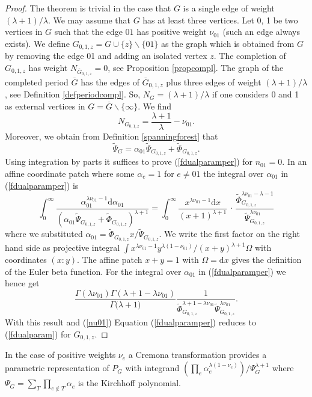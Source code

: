 \documentclass[oneside]{amsart}
\newcommand{\dd}{\mathrm{d}}
\newcommand{\Gg}{{\overline{G}}}
\theoremstyle{plain}
\begin{document}
\begin{proof}
The theorem is trivial in the case that $G$ is a single edge of weight $(\lambda+1)/\lambda$. We may assume that $G$ has at least three vertices. Let 0, 1 be two vertices in $G$
such that the edge $01$ has positive weight $\nu_{01}$ (such an edge always exists). We define $G_{0,1,z}=G\cup\{z\}\backslash\{01\}$ as the graph which is obtained
from $G$ by removing the edge 01 and adding an isolated vertex $z$. The completion of $G_{0,1,z}$ has weight $N_{\Gg_{0,1,z}}=0$, see Proposition \ref{propcompl}.
The graph of the completed period $\Gg$ has the edges of $\Gg_{0,1,z}$ plus three edges of weight $(\lambda+1)/\lambda$, see Definition \ref{defperiodcompl}.
So, $N_G=(\lambda+1)/\lambda$ if one considers 0 and 1 as external vertices in $G=\Gg\backslash\{\infty\}$. We find
\begin{equation}\label{nu01}
N_{G_{0,1,z}}=\frac{\lambda+1}{\lambda}-\nu_{01}.
\end{equation}
Moreover, we obtain from Definition \ref{spanningforest} that
$$
\widetilde\Psi_G=\alpha_{01}\widetilde\Psi_{G_{0,1,z}}+\widetilde\Phi_{G_{0,1,z}}.
$$
Using integration by parts it suffices to prove (\ref{fdualparamper}) for $n_{01}=0$. In an affine coordinate patch where some $\alpha_e=1$ for $e\neq01$ the integral over $\alpha_{01}$
in (\ref{fdualparamper}) is
$$
\int_0^\infty\frac{\alpha_{01}^{\lambda\nu_{01}-1}\dd\alpha_{01}}{(\alpha_{01}\widetilde\Psi_{G_{0,1,z}}+\widetilde\Phi_{G_{0,1,z}})^{\lambda+1}}
=\int_0^\infty\frac{x^{\lambda\nu_{01}-1}\dd x}{(x+1)^{\lambda+1}}\,\cdot\,\frac{\widetilde\Phi_{G_{0,1,z}}^{\lambda\nu_{01}-\lambda-1}}{\widetilde\Psi_{G_{0,1,z}}^{\lambda\nu_{01}}}
$$
where we substituted $\alpha_{01}=\widetilde\Phi_{G_{0,1,z}}x/\widetilde\Psi_{G_{0,1,z}}$. We write the first factor on the right hand side as projective integral
$\int x^{\lambda\nu_{01}-1}y^{\lambda(1-\nu_{01})}/{(x+y)^{\lambda+1}}\Omega$ with coordinates $(x:y)$. The affine patch $x+y=1$ with $\Omega=\dd x$ gives
the definition of the Euler beta function. For the integral over $\alpha_{01}$ in (\ref{fdualparamper}) we hence get
$$
\frac{\Gamma(\lambda\nu_{01})\Gamma(\lambda+1-\lambda\nu_{01})}{\Gamma{(\lambda+1})}\frac{1}{\widetilde\Phi_{G_{0,1,z}}^{\lambda+1-\lambda\nu_{01}}\widetilde\Psi_{G_{0,1,z}}^{\lambda\nu_{01}}}.
$$
With this result and (\ref{nu01}) Equation (\ref{fdualparamper}) reduces to (\ref{fdualparam}) for $G_{0,1,z}$.
\end{proof}
In the case of positive weights $\nu_e$ a Cremona transformation provides a parametric representation of $P_G$ with integrand $(\prod_e\alpha_e^{\lambda(1-\nu_e)})/\Psi_G^{\lambda+1}$
where $\Psi_G=\sum_T\prod_{e\notin T}\alpha_e$ is the Kirchhoff polynomial.
\end{document}
